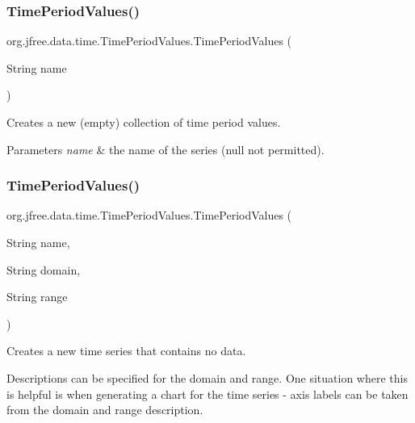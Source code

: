 \subsubsection{\texorpdfstring{Time\+Period\+Values()}{TimePeriodValues()}\hspace{0.1cm}{\footnotesize\ttfamily [1/2]}}
{\footnotesize\ttfamily org.\+jfree.\+data.\+time.\+Time\+Period\+Values.\+Time\+Period\+Values (\begin{DoxyParamCaption}\item[{String}]{name }\end{DoxyParamCaption})}

Creates a new (empty) collection of time period values.


\begin{DoxyParams}{Parameters}
{\em name} & the name of the series ({\ttfamily null} not permitted). \\
\hline
\end{DoxyParams}
\mbox{\label{classorg_1_1jfree_1_1data_1_1time_1_1_time_period_values_a0228f920440b8e63a80b8c5c26a2f3fa}} 
\subsubsection{\texorpdfstring{Time\+Period\+Values()}{TimePeriodValues()}\hspace{0.1cm}{\footnotesize\ttfamily [2/2]}}
{\footnotesize\ttfamily org.\+jfree.\+data.\+time.\+Time\+Period\+Values.\+Time\+Period\+Values (\begin{DoxyParamCaption}\item[{String}]{name,  }\item[{String}]{domain,  }\item[{String}]{range }\end{DoxyParamCaption})}

Creates a new time series that contains no data. 

Descriptions can be specified for the domain and range. One situation where this is helpful is when generating a chart for the time series -\/ axis labels can be taken from the domain and range description.


